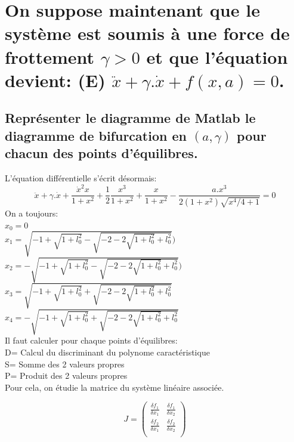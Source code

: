 \documentclass[10pt,a4paper]{article}
\begin{document}
\section{On suppose maintenant que le système est soumis à une force de frottement $\gamma > 0$ et que l'équation devient: (E) $\ddot{x} + \gamma.\dot{x} + f(x,a) = 0$.}
\subsection{Représenter le diagramme de Matlab le diagramme de bifurcation  en $(a,\gamma)$ pour chacun des points d'équilibres.}
L'équation différentielle s'écrit désormais:\\
\[  \ddot{x} + \gamma.\dot{x} + \frac{\dot{x}^2x}{1+x^2} + \frac{1}{2}\frac{x^3}{1+x^2} + \frac{x}{1+x^2} - \frac{a.x^3}{2(1+x^2)\sqrt{x^4/4+1}}=0 \]	
On a toujours:\\
$x_0=0$\\
$x_1=\sqrt{-1+\sqrt{1+l_0^2}-\sqrt{-2-2\sqrt{1+l_0^2}+l_0^2}})$\\
$x_2=-\sqrt{-1+\sqrt{1+l_0^2}-\sqrt{-2-2\sqrt{1+l_0^2}+l_0^2}})$\\
$x_3=\sqrt{-1+\sqrt{1+l_0^2}+\sqrt{-2-2\sqrt{1+l_0^2}+l_0^2}}$\\
$x_4=-\sqrt{-1+\sqrt{1+l_0^2}+\sqrt{-2-2\sqrt{1+l_0^2}+l_0^2}}$\\

Il faut calculer pour chaque points d'équilibres:\\
D= Calcul du discriminant du polynome caractéristique\\
S= Somme des 2 valeurs propres\\
P= Produit des 2 valeurs propres \\

Pour cela, on étudie la matrice du système linéaire associée.

\[
J=
\begin{pmatrix}
\frac{\delta f_1}{\delta x_1} & \frac{\delta f_1}{\delta x_2}\\
\frac{\delta f_2}{\delta x_1} & \frac{\delta f_2}{\delta x_2} \\
\end{pmatrix}
\]
\end{document}
